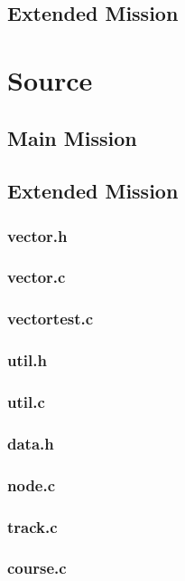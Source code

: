 \documentclass[a4paper, twoside]{article}
\begin{document}
\newpage
\subsection{Extended Mission}


\newpage
\section{Source}
\subsection{Main Mission}

\newpage
\subsection{Extended Mission}
\subsubsection{vector.h}

\subsubsection{vector.c}

\subsubsection{vectortest.c}

\subsubsection{util.h}

\subsubsection{util.c}

\subsubsection{data.h}

\subsubsection{node.c}

\subsubsection{track.c}

\subsubsection{course.c}

\end{document}
